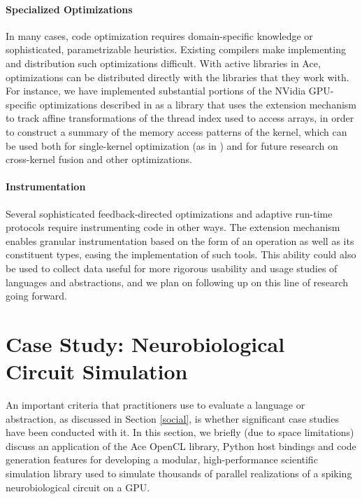 \documentclass{sig-alternate}
\begin{document}
\paragraph{Specialized Optimizations}
In many cases, code optimization requires domain-specific knowledge or sophisticated, parametrizable heuristics. Existing compilers make implementing and distribution such optimizations difficult. With active libraries in Ace, optimizations can be distributed directly with the libraries that they work with. For instance, we have implemented substantial portions of the NVidia GPU-specific optimizations described in \cite{yang2010gpgpu} as a library that uses the extension mechanism to track affine transformations of the thread index used to access arrays, in order to construct a summary of the memory access patterns of the kernel, which can be used both for single-kernel optimization (as in \cite{yang2010gpgpu}) and for future research on cross-kernel fusion and other optimizations.

\paragraph{Instrumentation}
Several sophisticated feedback-directed optimizations and adaptive run-time protocols require instrumenting code in other ways. The extension mechanism enables granular instrumentation based on the form of an operation as well as its constituent types, easing the implementation of such tools. This ability could also be used to collect data useful for more rigorous usability and usage studies of languages and abstractions, and we plan on following up on this line of research going forward.


\section{Case Study: Neurobiological Circuit Simulation}
An important criteria that practitioners use to evaluate a language or abstraction, as discussed in Section \ref{social}, is whether significant case studies have been conducted with it. In this section, we briefly (due to space limitations) discuss an application of the Ace OpenCL library, Python host bindings and code generation features for developing a modular, high-performance scientific simulation library used to simulate  thousands of parallel realizations of a spiking neurobiological circuit on a GPU.
\end{document}
